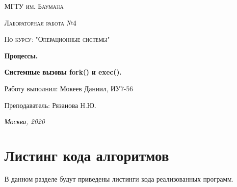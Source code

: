 \documentclass[12pt]{report}
\begin{document}
	\begin{titlepage}
		\centering
		{\scshape\LARGE МГТУ им. Баумана \par}
		\vspace{3cm}
		{\scshape\Large Лабораторная работа №4\par}
		\vspace{0.5cm}	
		{\scshape\Large По курсу: "Операционные системы"\par}
		\vspace{1.5cm}
		\centering
		{\huge\bfseries Процессы. \par}
		\centering
		{\huge\bfseries Системные вызовы fork() и exec().\par}
		\vspace{2cm}
		\Large Работу выполнил: Мокеев Даниил, ИУ7-56\par
		\vspace{0.5cm}
		\Large Преподаватель:  Рязанова Н.Ю.\par
		
		\vfill
		\large \textit {Москва, 2020} \par
	\end{titlepage}
	
	
	\newpage
	
	\section{Листинг кода алгоритмов}
	В данном разделе будут приведены листинги кода реализованных программ. 
	
\end{document}

